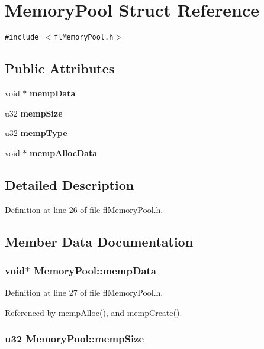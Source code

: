 \section{Memory\-Pool Struct Reference}
\label{structMemoryPool}
{\tt \#include $<$fl\-Memory\-Pool.h$>$}

\subsection*{Public Attributes}
\begin{CompactItemize}
\item 
void $\ast$ {\bf memp\-Data}
\item 
u32 {\bf memp\-Size}
\item 
u32 {\bf memp\-Type}
\item 
void $\ast$ {\bf memp\-Alloc\-Data}
\end{CompactItemize}


\subsection{Detailed Description}




Definition at line 26 of file fl\-Memory\-Pool.h.

\subsection{Member Data Documentation}
\subsubsection{\setlength{\rightskip}{0pt plus 5cm}void$\ast$ {\bf Memory\-Pool::memp\-Data}}\label{structMemoryPool_a725163641bba77273a86ba95ed32053}




Definition at line 27 of file fl\-Memory\-Pool.h.

Referenced by memp\-Alloc(), and memp\-Create().
\subsubsection{\setlength{\rightskip}{0pt plus 5cm}u32 {\bf Memory\-Pool::memp\-Size}}\label{structMemoryPool_9774b3baa29818451bdd4f80bf764459}




